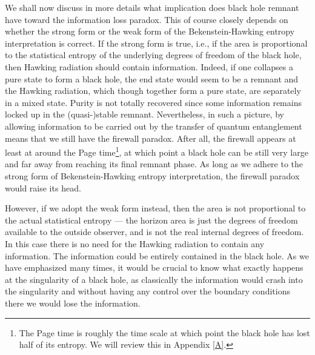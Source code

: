 \documentclass[12pt]{article}
\newcommand{\2}{$^2$}
\newcommand{\3}{$^3$}
\newcommand{\4}{$_4$}
\newcommand{\5}{$_5$}
\begin{document}
We shall now discuss in more details what implication does black hole remnant have toward the information loss paradox. This of course closely depends on whether the strong form or the weak form of the Bekenstein-Hawking entropy interpretation is correct. If the strong form is true, i.e., if the area is proportional to the statistical entropy of the underlying degrees of freedom of the black hole, then Hawking radiation should contain information. Indeed, if one collapses a pure state to form a black hole, the end state would seem to be a
remnant and the Hawking radiation, which though together form a pure state, are separately in a mixed state. Purity is not totally recovered since some information remains locked up in the (quasi-)stable remnant. Nevertheless, in such a picture, by allowing information to be carried out by the transfer of quantum entanglement means that we still have the firewall paradox. After all, the firewall appears at least at around the Page time\footnote{The Page time is roughly the time scale at which point the black hole has lost half of its entropy. We will review this in Appendix \ref{A}.}, at which point a black hole can be still very large and far away from reaching its final remnant phase. As long as we adhere to the strong form of Bekenstein-Hawking entropy interpretation, the firewall paradox would raise its head. 

However, if we adopt the weak form instead, then the area is not proportional to the actual statistical entropy --- the horizon area is just the degrees of freedom available to the outside observer, and is not the real internal degrees of freedom. In this case there is no need for the Hawking radiation to contain any information. 
The information could be entirely contained in the black hole. As we have emphasized many times, it would be crucial to know what exactly happens at the singularity of a black hole, as classically the information would crash into the singularity and without having any control over the boundary conditions there we would lose the information. %
\end{document}
